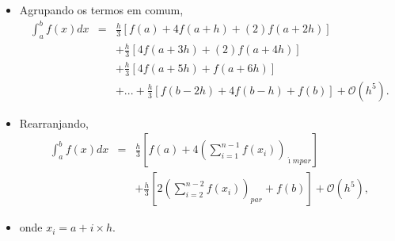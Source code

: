 \documentclass[xcolor=table]{beamer}
\newenvironment{stepitemize}{\begin{itemize}[<+->]}{\end{itemize} }
\begin{document}
\begin{frame}%

\begin{stepitemize}
\item Agrupando os termos em comum,%
\begin{eqnarray*}
\int_{a}^{b}f\left( x\right) dx &=&\frac{h}{3}\left[ f\left( a\right)
+4f\left( a+h\right) +\left( 2\right) f\left( a+2h\right) \right]  \\
&&+\frac{h}{3}\left[ 4f\left( a+3h\right) +\left( 2\right) f\left(
a+4h\right) \right]  \\
&&+\frac{h}{3}\left[ 4f\left( a+5h\right) +f\left( a+6h\right) \right]  \\
&&+...+\frac{h}{3}\left[ f\left( b-2h\right) +4f\left( b-h\right) +f\left(
b\right) \right] +\mathcal{O}\left( h^{5}\right) .
\end{eqnarray*}

\item Rearranjando,%
\begin{eqnarray*}
\int_{a}^{b}f\left( x\right) dx &=&\frac{h}{3}\left[ f\left( a\right)
+4\left( \sum_{i=1}^{n-1}f\left( x_{i}\right) \right) _{\acute{\imath}mpar}%
\right]  \\
&&+\frac{h}{3}\left[ 2\left( \sum_{i=2}^{n-2}f\left( x_{i}\right) \right)
_{par}+f\left( b\right) \right] +\mathcal{O}\left( h^{5}\right),
\end{eqnarray*}

\item onde $x_{i}=a+i\times h$.
\end{stepitemize}

\end{frame}%
\end{document}
